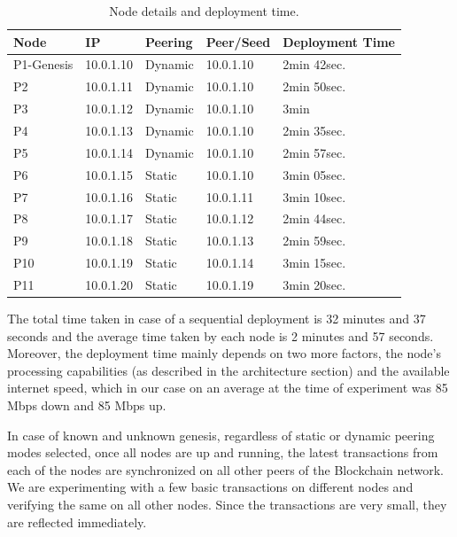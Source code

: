 \begin{table}[h]
\centering
\label{tab:node_details_dep}
\begin{tabular}{|l|l|l|l|l|}
\hline
Node       & IP        & Peering & Peer/Seed & Deployment Time \\ \hline
P1-Genesis & 10.0.1.10 & Dynamic & 10.0.1.10 & 2min 42sec.  \\ \hline
P2         & 10.0.1.11 & Dynamic & 10.0.1.10 & 2min 50sec.  \\ \hline
P3         & 10.0.1.12 & Dynamic & 10.0.1.10 & 3min         \\ \hline
P4         & 10.0.1.13 & Dynamic & 10.0.1.10 & 2min 35sec.  \\ \hline
P5         & 10.0.1.14 & Dynamic & 10.0.1.10 & 2min 57sec.  \\ \hline
P6         & 10.0.1.15 & Static  & 10.0.1.10 & 3min 05sec.  \\ \hline
P7         & 10.0.1.16 & Static  & 10.0.1.11 & 3min 10sec.  \\ \hline
P8         & 10.0.1.17 & Static  & 10.0.1.12 & 2min 44sec.  \\ \hline
P9         & 10.0.1.18 & Static  & 10.0.1.13 & 2min 59sec.  \\ \hline
P10        & 10.0.1.19 & Static  & 10.0.1.14 & 3min 15sec.  \\ \hline
P11        & 10.0.1.20 & Static  & 10.0.1.19 & 3min 20sec.  \\ \hline
\end{tabular}
\caption{Node details and deployment time.}
\vspace{-4mm}
\end{table}

The total time taken in case of a sequential deployment is 32 minutes and 37 seconds and the average time taken by each node is 2 minutes and 57 seconds. Moreover, the deployment time mainly depends on two more factors, the node’s processing capabilities (as described in the architecture section) and the available internet speed, which in our case on an average at the time of experiment was 85 Mbps down and 85 Mbps up.

In case of known and unknown genesis, regardless of static or dynamic peering modes selected, once all nodes are up and running, the latest transactions from each of the nodes are synchronized on all other peers of the Blockchain network. We are experimenting with a few basic transactions on different nodes and verifying the same on all other nodes. Since the transactions are very small, they are reflected immediately.


